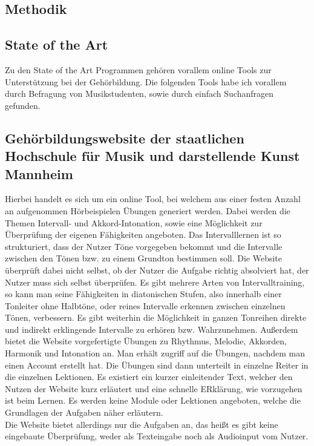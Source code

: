 \subsection{Methodik}
%

\subsection{State of the Art}

Zu den State of the Art Programmen gehören vorallem online Tools zur Unterstützung bei der Gehörbildung. Die folgenden Tools habe ich vorallem durch Befragung von Musikstudenten, sowie durch einfach Suchanfragen gefunden.

\subsection*{Gehörbildungswebsite der staatlichen Hochschule für Musik und darstellende Kunst Mannheim}
\label{sec:Mannheim}
Hierbei handelt es sich um ein online Tool, bei welchem aus einer festen Anzahl an aufgenommen Hörbeispielen Übungen generiert werden.
Dabei werden die Themen Intervall- und Akkord-Intonation, sowie eine Möglichkeit zur Überprüfung der eigenen Fähigkeiten angeboten. Das Intervalllernen ist so strukturiert, dass der Nutzer Töne vorgegeben bekommt
und die Intervalle zwischen den Tönen bzw. zu einem Grundton bestimmen soll. Die Website überprüft dabei nicht selbst, ob der Nutzer die Aufgabe richtig absolviert hat, der Nutzer muss sich selbst überprüfen. 
Es gibt mehrere Arten von Intervalltraining, so kann man seine Fähigkeiten in diatonischen Stufen, also innerhalb einer Tonleiter ohne Halbtöne, oder reines Intervalle erkennen zwischen einzelnen Tönen, verbessern. Es gibt weiterhin die Möglichkeit in ganzen Tonreihen
direkte und indirekt erklingende Intervalle zu erhören bzw. Wahrzunehmen. Außerdem bietet die Website vorgefertigte Übungen zu Rhythmus, Melodie, Akkorden, Harmonik und Intonation an. Man erhält zugriff auf die Übungen, nachdem man einen Account 
erstellt hat. Die Übungen sind dann unterteilt in einzelne Reiter in die einzelnen Lektionen. Es existiert ein kurzer einleitender Text, welcher den Nutzen der Website kurz erläutert und eine schnelle ERklärung, wie vorzugehen ist beim Lernen. Es werden keine 
Module oder Lektionen angeboten, welche die Grundlagen der Aufgaben näher erläutern.\\
Die Website bietet allerdings nur die Aufgaben an, das heißt es gibt keine eingebaute Überprüfung, weder als Texteingabe noch als Audioinput vom Nutzer. \cite{hfmdk_mannheim}

